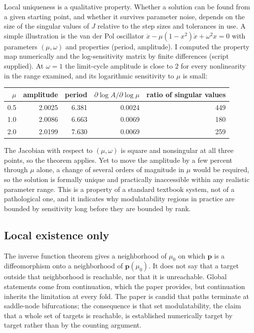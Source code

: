 \documentclass[11pt]{article}
\begin{document}
Local uniqueness is a qualitative property. Whether a solution can be found from a given starting point, and whether it survives parameter noise, depends on the size of the singular values of $J$ relative to the step sizes and tolerances in use. A simple illustration is the van der Pol oscillator $\ddot x-\mu(1-x^2)\dot x+\omega^2x=0$ with parameters $(\mu,\omega)$ and properties (period, amplitude). I computed the property map numerically and the log-sensitivity matrix by finite differences (script supplied). At $\omega=1$ the limit-cycle amplitude is close to $2$ for every nonlinearity in the range examined, and its logarithmic sensitivity to $\mu$ is small:
\begin{center}
\begin{tabular}{rrrrr}
\toprule
$\mu$ & amplitude & period & $\partial\log A/\partial\log\mu$ & ratio of singular values\\
\midrule
0.5 & 2.0025 & 6.381 & 0.0024 & 449\\
1.0 & 2.0086 & 6.663 & 0.0069 & 180\\
2.0 & 2.0199 & 7.630 & 0.0069 & 259\\
\bottomrule
\end{tabular}
\end{center}
The Jacobian with respect to $(\mu,\omega)$ is square and nonsingular at all three points, so the theorem applies. Yet to move the amplitude by a few percent through $\mu$ alone, a change of several orders of magnitude in $\mu$ would be required, so the solution is formally unique and practically inaccessible within any realistic parameter range. This is a property of a standard textbook system, not of a pathological one, and it indicates why modulatability regions in practice are bounded by sensitivity long before they are bounded by rank.

\subsection{Local existence only}

The inverse function theorem gives a neighborhood of $\mu_0$ on which $\mathbf p$ is a diffeomorphism onto a neighborhood of $\mathbf p(\mu_0)$. It does not say that a target outside that neighborhood is reachable, nor that it is unreachable. Global statements come from continuation, which the paper provides, but continuation inherits the limitation at every fold. The paper is candid that paths terminate at saddle-node bifurcations; the consequence is that set modulatability, the claim that a whole set of targets is reachable, is established numerically target by target rather than by the counting argument.
\end{document}
